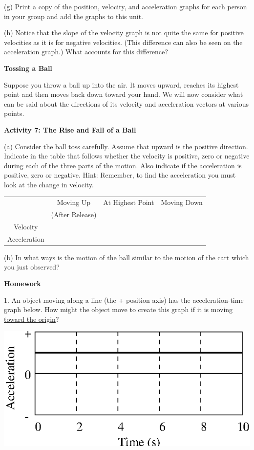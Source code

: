(g) Print a copy of the position, velocity, and acceleration graphs for each person in your group and add the graphs to this unit.

(h) Notice that the slope of the velocity graph is not quite the same for positive velocities as it is for negative velocities. (This difference can also be seen on the acceleration graph.) What accounts for this difference?
\vspace{20mm}

\textbf{Tossing a Ball }

Suppose you throw a ball up into the air. It moves upward, reaches its highest
point and then moves back down toward your hand. We will now consider what can be said about the directions of its velocity and acceleration vectors at various points.

\textbf{Activity 7: The Rise and Fall of a Ball} 

(a) Consider the ball toss carefully. Assume that upward is the positive direction.
Indicate in the table that follows whether the velocity is positive, zero or
negative during each of the three parts of the motion. Also indicate if the
acceleration is positive, zero or negative. Hint: Remember, to find the acceleration
you must look at the change in velocity.

\vspace{0.3cm}
{\centering \begin{tabular}{|c|c|c|c|}
\hline 
&
Moving Up&
At Highest Point&
Moving Down\\
&
(After Release)&
&
\\
\hline 
Velocity&
&
&
\\
\hline 
Acceleration&
&
&
\\
\hline 
\end{tabular}\par}
\vspace{0.3cm}

(b) In what ways is the motion of the ball similar to the motion of the cart
which you just observed?
\vspace{20mm}

\textbf{Homework} 

1. An object moving along a line (the + position axis) has the acceleration-time graph below. How might the object move to create this graph if it is moving
\underline{toward the origin}?

\vspace{0.3cm}
{\par\centering \includegraphics{slowing/slowing_fig6.eps} \par}
\vspace{0.3cm}

